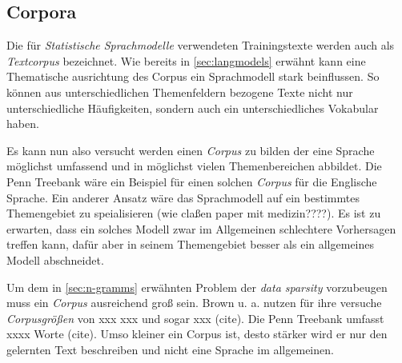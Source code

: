 \subsection{Corpora}
    Die für \emph{Statistische Sprachmodelle} verwendeten Trainingstexte werden auch als \emph{Textcorpus} bezeichnet. Wie bereits in \autoref{sec:langmodels} erwähnt kann eine Thematische ausrichtung des Corpus ein Sprachmodell stark beinflussen. So können aus unterschiedlichen Themenfeldern bezogene Texte nicht nur unterschiedliche Häufigkeiten, sondern auch ein unterschiedliches Vokabular haben.
        
	Es kann nun also versucht werden einen \emph{Corpus} zu bilden der eine Sprache möglichst umfassend und in möglichst vielen Themenbereichen abbildet. Die Penn Treebank wäre ein Beispiel für einen solchen \emph{Corpus} für die Englische Sprache. Ein anderer Ansatz wäre das Sprachmodell auf ein bestimmtes Themengebiet zu speialisieren (wie claßen paper mit medizin????). Es ist zu erwarten, dass ein solches Modell zwar im Allgemeinen schlechtere Vorhersagen treffen kann, dafür aber in seinem Themengebiet besser als ein allgemeines Modell abschneidet.
        
        Um dem in \autoref{sec:n-gramms} erwähnten Problem der \emph{data sparsity} vorzubeugen muss ein \emph{Corpus} ausreichend groß sein. Brown u. a. nutzen für ihre versuche \emph{Corpusgrößen} von xxx xxx und sogar xxx (cite). Die Penn Treebank umfasst xxxx Worte (cite). Umso kleiner ein Corpus ist, desto stärker wird er nur den gelernten Text beschreiben und nicht eine Sprache im allgemeinen.